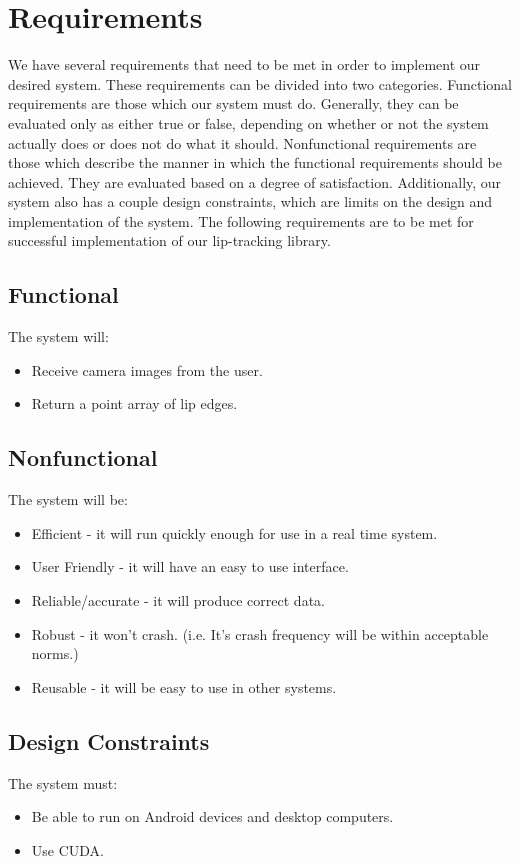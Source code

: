 \chapter{Requirements}

We have several requirements that need to be met in order to implement our desired system. These requirements can be divided into two categories. Functional requirements are those which our system must do. Generally, they can be evaluated only as either true or false, depending on whether or not the system actually does or does not do what it should. Nonfunctional requirements are those which describe the manner in which the functional requirements should be achieved. They are evaluated based on a degree of satisfaction. Additionally, our system also has a couple design constraints, which are limits on the design and implementation of the system. The following requirements are to be met for successful implementation of our lip-tracking library.

\section{Functional}
The system will:
\begin{itemize}
\item Receive camera images from the user.
\item Return a point array of lip edges.
\end{itemize}


\section{Nonfunctional}
The system will be:
\begin{itemize}
\item Efficient - it will run quickly enough for use in a real time system.
\item User Friendly - it will have an easy to use interface.
\item Reliable/accurate - it will produce correct data.
\item Robust - it won't crash. (i.e. It's crash frequency will be within acceptable norms.)
\item Reusable - it will be easy to use in other systems.
\end{itemize}


\section{Design Constraints}
The system must:
\begin{itemize}
\item Be able to run on Android devices and desktop computers.
\item Use CUDA.
\end{itemize}